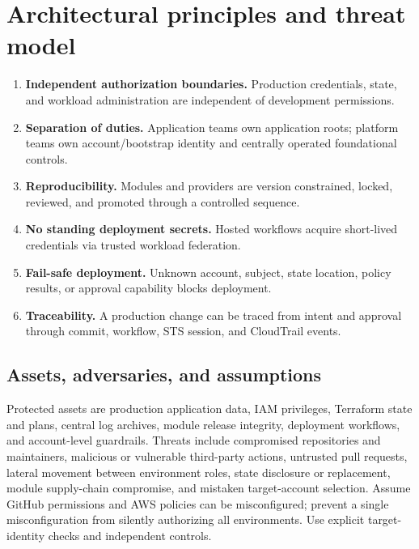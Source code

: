 \documentclass[10pt,letterpaper]{article}
\begin{document}
\section{Architectural principles and threat model}
\begin{enumerate}
\item \textbf{Independent authorization boundaries.} Production credentials, state, and workload administration are independent of development permissions.
\item \textbf{Separation of duties.} Application teams own application roots; platform teams own account/bootstrap identity and centrally operated foundational controls.
\item \textbf{Reproducibility.} Modules and providers are version constrained, locked, reviewed, and promoted through a controlled sequence.
\item \textbf{No standing deployment secrets.} Hosted workflows acquire short-lived credentials via trusted workload federation.
\item \textbf{Fail-safe deployment.} Unknown account, subject, state location, policy results, or approval capability blocks deployment.
\item \textbf{Traceability.} A production change can be traced from intent and approval through commit, workflow, STS session, and CloudTrail events.
\end{enumerate}
\subsection{Assets, adversaries, and assumptions}
Protected assets are production application data, IAM privileges, Terraform state and plans, central log archives, module release integrity, deployment workflows, and account-level guardrails. Threats include compromised repositories and maintainers, malicious or vulnerable third-party actions, untrusted pull requests, lateral movement between environment roles, state disclosure or replacement, module supply-chain compromise, and mistaken target-account selection. Assume GitHub permissions and AWS policies can be misconfigured; prevent a single misconfiguration from silently authorizing all environments. Use explicit target-identity checks and independent controls.
\end{document}
